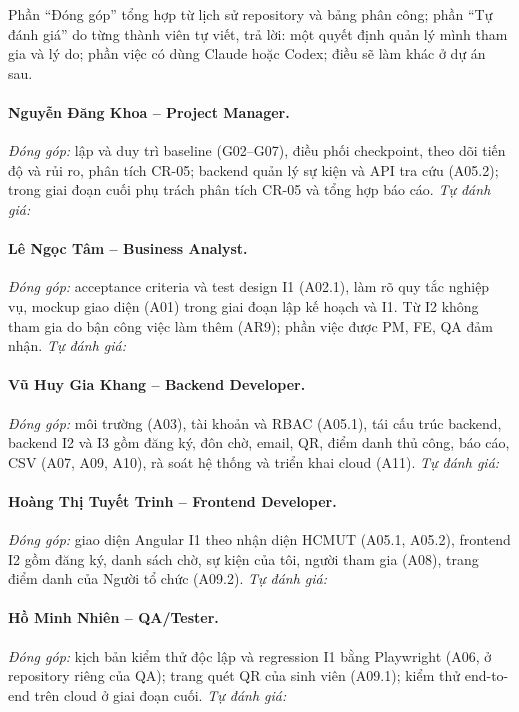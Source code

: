 Phần ``Đóng góp'' tổng hợp từ lịch sử repository và bảng phân công; phần ``Tự đánh giá'' do từng thành viên tự viết, trả lời: một quyết định quản lý mình tham gia và lý do; phần việc có dùng Claude hoặc Codex; điều sẽ làm khác ở dự án sau.

\paragraph{Nguyễn Đăng Khoa -- Project Manager.} \textit{Đóng góp:} lập và duy trì baseline (G02--G07), điều phối checkpoint, theo dõi tiến độ và rủi ro, phân tích CR-05; backend quản lý sự kiện và API tra cứu (A05.2); trong giai đoạn cuối phụ trách phân tích CR-05 và tổng hợp báo cáo. \textit{Tự đánh giá:} 

\paragraph{Lê Ngọc Tâm -- Business Analyst.} \textit{Đóng góp:} acceptance criteria và test design I1 (A02.1), làm rõ quy tắc nghiệp vụ, mockup giao diện (A01) trong giai đoạn lập kế hoạch và I1. Từ I2 không tham gia do bận công việc làm thêm (AR9); phần việc được PM, FE, QA đảm nhận. \textit{Tự đánh giá:} 

\paragraph{Vũ Huy Gia Khang -- Backend Developer.} \textit{Đóng góp:} môi trường (A03), tài khoản và RBAC (A05.1), tái cấu trúc backend, backend I2 và I3 gồm đăng ký, đôn chờ, email, QR, điểm danh thủ công, báo cáo, CSV (A07, A09, A10), rà soát hệ thống và triển khai cloud (A11). \textit{Tự đánh giá:} 

\paragraph{Hoàng Thị Tuyết Trinh -- Frontend Developer.} \textit{Đóng góp:} giao diện Angular I1 theo nhận diện HCMUT (A05.1, A05.2), frontend I2 gồm đăng ký, danh sách chờ, sự kiện của tôi, người tham gia (A08), trang điểm danh của Người tổ chức (A09.2). \textit{Tự đánh giá:} 

\paragraph{Hồ Minh Nhiên -- QA/Tester.} \textit{Đóng góp:} kịch bản kiểm thử độc lập và regression I1 bằng Playwright (A06, ở repository riêng của QA); trang quét QR của sinh viên (A09.1); kiểm thử end-to-end trên cloud ở giai đoạn cuối. \textit{Tự đánh giá:} 
